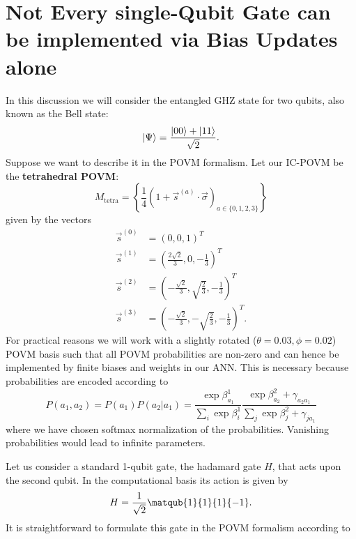 \documentclass[a4]{article}
\begin{document}
\section{Not Every single-Qubit Gate can be implemented via Bias Updates alone}
In this discussion we will consider the entangled GHZ state for two qubits, also
 known as the Bell state:
\begin{equation*}
    \ket{\Psi} = \frac{\ket{00} + \ket{11}}{\sqrt{2}}.
\end{equation*}
Suppose we want to describe it in the POVM formalism. Let our IC-POVM be the \textbf{tetrahedral POVM}:
\begin{equation}
    \label{tetra-POVM}
    M_{\text{tetra}} = \left\{ \frac{1}{4}(1 + \vec{s}^{(a)} \cdot
    \vec{\sigma})_{a \in
    \{0,1,2,3\} } \right\}
\end{equation}
given by the vectors
\begin{align*}
    \vec{s}^{(0)} &= \left(0, 0, 1\right)^T \\
    \vec{s}^{(1)} &= \left(\frac{2 \sqrt{2}}{3}, 0, - \frac{1}{3}\right)^T \\
    \vec{s}^{(2)} &= \left(-\frac{\sqrt{2}}{3}, \sqrt{\frac{2}{3}}, -
    \frac{1}{3}\right)^T \\
    \vec{s}^{(3)} &= \left(-\frac{\sqrt{2}}{3}, -\sqrt{\frac{2}{3}}, -
    \frac{1}{3} \right)^T.
\end{align*}
For practical reasons we will work with a slightly rotated
($\theta=0.03,\phi=0.02$) POVM basis such that all POVM probabilities are
non-zero and can hence be implemented by finite biases and weights in our ANN.
This is necessary because probabilities are encoded according to
\begin{equation}
    P(a_1, a_2) = P(a_1) P(a_2|a_1) = \frac{\exp{\beta^1_{a_1}}}{\sum_i
     \exp{\beta^1_i}}
    \frac{\exp{\beta^2_{a_2} + \gamma_{a_2a_1}}}{\sum_j \exp{\beta^2_{j} +
     \gamma_{ja_1}}}
    \label{eq:ANN-probs}
\end{equation}
where we have chosen softmax normalization of the probabilities. Vanishing probabilities would lead to infinite parameters. \par
Let us consider a standard 1-qubit gate, the hadamard gate $H$, that acts upon
the second qubit. In the computational basis its action is given by
\begin{equation}
    H = \frac{1}{\sqrt{2}}\matqub{1}{1}{1}{-1}.
\end{equation}
It is straightforward to formulate this gate in the POVM formalism according to
\end{document}
